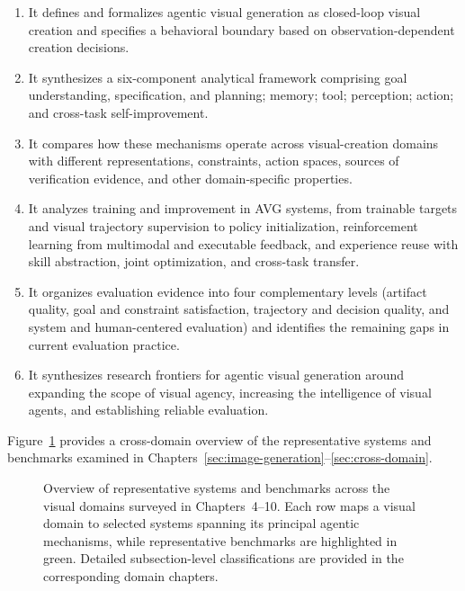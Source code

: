 \begin{enumerate}
  \item It defines and formalizes agentic visual generation as closed-loop visual creation and specifies a behavioral boundary based on observation-dependent creation decisions.
  \item It synthesizes a six-component analytical framework comprising goal understanding, specification, and planning; memory; tool; perception; action; and cross-task self-improvement.
  \item It compares how these mechanisms operate across visual-creation domains with different representations, constraints, action spaces, sources of verification evidence, and other domain-specific properties.
  \item It analyzes training and improvement in AVG systems, from trainable targets and visual trajectory supervision to policy initialization, reinforcement learning from multimodal and executable feedback, and experience reuse with skill abstraction, joint optimization, and cross-task transfer.
  \item It organizes evaluation evidence into four complementary levels (artifact quality, goal and constraint satisfaction, trajectory and decision quality, and system and human-centered evaluation) and identifies the remaining gaps in current evaluation practice.
  \item It synthesizes research frontiers for agentic visual generation around expanding the scope of visual agency, increasing the intelligence of visual agents, and establishing reliable evaluation.
\end{enumerate}

Figure~\ref{fig:survey-representative-systems} provides a cross-domain
overview of the representative systems and benchmarks examined in
Chapters~\ref{sec:image-generation}--\ref{sec:cross-domain}.

\begin{figure}[t]
  \centering
  
  \caption{Overview of representative systems and benchmarks across the
  visual domains surveyed in Chapters~4--10. Each row maps a visual domain
  to selected systems spanning its principal agentic mechanisms, while
  representative benchmarks are highlighted in green. Detailed
  subsection-level classifications are provided in the corresponding
  domain chapters.}
  \label{fig:survey-representative-systems}
\end{figure}

